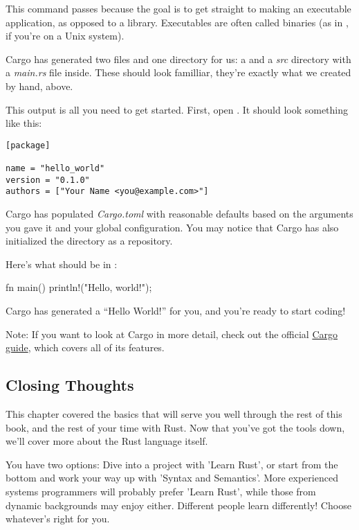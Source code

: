 This command passes  because the goal is to get straight to making an executable application, as opposed to a 
library. Executables are often called binaries (as in , if you're on a Unix system).

\blank

Cargo has generated two files and one directory for us: a  and a \emph{src} directory with a \emph{main.rs}
file inside. These should look familliar, they're exactly what we created by hand, above.

\blank

This output is all you need to get started. First, open . It should look something like this:

\begin{verbatim}
[package]

name = "hello_world"
version = "0.1.0"
authors = ["Your Name <you@example.com>"]  
\end{verbatim}

Cargo has populated \emph{Cargo.toml} with reasonable defaults based on the arguments you gave it and your 
global configuration. You may notice that Cargo has also initialized the  directory as a  
repository.

\blank

Here's what should be in :

\begin{rustc}
fn main() {
    println!("Hello, world!");
}
\end{rustc}

Cargo has generated a \enquote{Hello World!} for you, and you're ready to start coding!

\begin{myquote}
Note: If you want to look at Cargo in more detail, check out the official \href{http://doc.crates.io/guide.html}{Cargo guide}, 
which covers all of its features.
\end{myquote}

\subsection{Closing Thoughts}

This chapter covered the basics that will serve you well through the rest of this book, and the rest of your time with Rust. 
Now that you've got the tools down, we'll cover more about the Rust language itself.

\blank

You have two options: Dive into a project with 'Learn Rust', or start from the bottom and work your way up with 
'Syntax and Semantics'. More experienced systems programmers will probably prefer 'Learn Rust', while those from 
dynamic backgrounds may enjoy either. Different people learn differently! Choose whatever's right for you.
